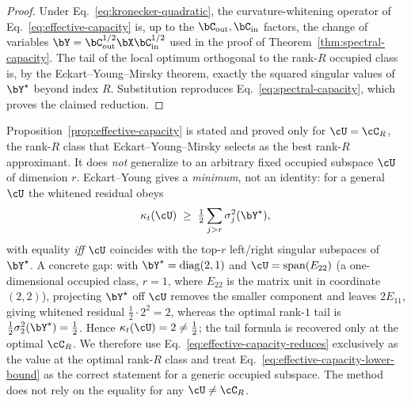 \begin{proof}
Under Eq.~\eqref{eq:kronecker-quadratic}, the curvature-whitening operator
of Eq.~\eqref{eq:effective-capacity} is, up to the $\bC_{\mathrm{out}},
\bC_{\mathrm{in}}$ factors, the change of variables
$\bY=\bC_{\mathrm{out}}^{1/2}\bX\bC_{\mathrm{in}}^{1/2}$ used in the proof of
Theorem~\ref{thm:spectral-capacity}. The tail of the local optimum orthogonal
to the rank-$R$ occupied class is, by the Eckart--Young--Mirsky theorem, exactly
the squared singular values of $\bY^\star$ beyond index $R$. Substitution
reproduces Eq.~\eqref{eq:spectral-capacity}, which proves the claimed reduction.
\end{proof}

\begin{remark}
\label{rem:effective-capacity-optimal-only}
Proposition~\ref{prop:effective-capacity} is stated and proved only for
$\cU=\cC_R$, the rank-$R$ class that Eckart--Young--Mirsky selects as the best
rank-$R$ approximant. It does \emph{not} generalize to an arbitrary fixed
occupied subspace $\cU$ of dimension $r$. Eckart--Young gives a
\emph{minimum}, not an identity: for a general $\cU$ the whitened residual obeys
\begin{equation}
  \kappa_t(\cU)\;\ge\;\tfrac12\sum_{j>r}\sigma_j^2(\bY^\star),
  \label{eq:effective-capacity-lower-bound}
\end{equation}
with equality \emph{iff} $\cU$ coincides with the top-$r$ left/right singular
subspaces of $\bY^\star$. A concrete gap: with $\bY^\star=\operatorname{diag}(2,1)$
and $\cU=\operatorname{span}(E_{22})$ (a one-dimensional occupied class,
$r=1$, where $E_{22}$ is the matrix unit in coordinate $(2,2)$), projecting
$\bY^\star$ off $\cU$ removes the smaller component and leaves $2E_{11}$, giving
whitened residual $\tfrac12\cdot 2^2=2$, whereas the optimal rank-$1$ tail is
$\tfrac12\sigma_2^2(\bY^\star)=\tfrac12$. Hence $\kappa_t(\cU)=2\neq\tfrac12$; the
tail formula is recovered only at the optimal $\cC_R$. We therefore use Eq.~\eqref{eq:effective-capacity-reduces} exclusively
as the value at the optimal rank-$R$ class and treat
Eq.~\eqref{eq:effective-capacity-lower-bound} as the correct statement for a
generic occupied subspace. The method does not rely on the equality for any
$\cU\neq\cC_R$.
\end{remark}

